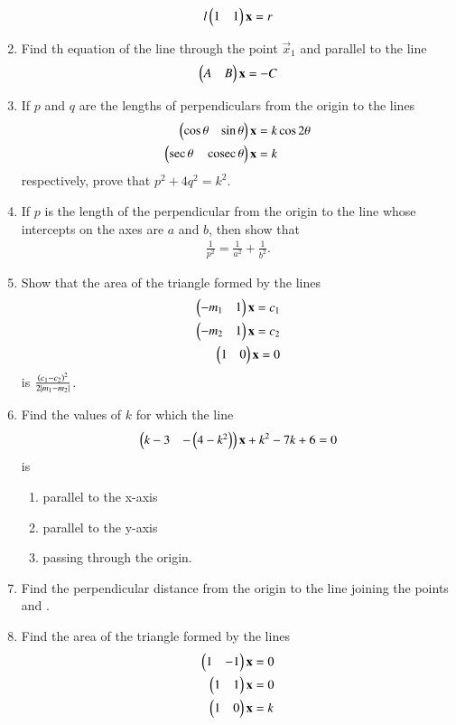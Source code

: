 \begin{enumerate}[label=\arabic*.,ref=\thesubsection.\theenumi]
\begin{align}
l\begin{pmatrix}1 & 1\end{pmatrix}\mathbf{x} = r
\end{align}
%
\item Find th equation of the line through the point $\vec{x}_1$ and parallel to the line
%
\begin{align}
\begin{pmatrix}A & B\end{pmatrix}\mathbf{x} = -C
\end{align}
%
\item If $p$ and $q$ are the lengths of perpendiculars from the origin to the lines 
%
\begin{align}
\begin{pmatrix}\cos\theta & \sin\theta\end{pmatrix}\mathbf{x} &= k\cos2\theta
\\
\begin{pmatrix}\sec\theta & \,\text{cosec}\,\theta\end{pmatrix}\mathbf{x} &= k
\end{align}
%
respectively, prove that $p^2+4q^2=k^2$.
\item If $p$ is the length of the perpendicular from the origin to the line whose intercepts on the axes are $a$ and $b$, then show that 
%
\begin{align}
\frac{1}{p^2} = \frac{1}{a^2}+\frac{1}{b^2}.
\end{align}
%
\item Show that the area of the triangle formed by the lines
%
\begin{align}
\begin{pmatrix}-m_1 & 1\end{pmatrix}\mathbf{x} = c_1
\\
\begin{pmatrix}-m_2 & 1\end{pmatrix}\mathbf{x} = c_2
\\
\begin{pmatrix}1 & 0\end{pmatrix}\mathbf{x} = 0
\end{align}
%
is $\frac{\left(c_1-c_2\right)^2}{2\left\vert m_1-m_2\right\vert}$.
\item Find the values of $k$ for which the line 
%
\begin{align}
\begin{pmatrix}k-3 & -\left(4-k^2\right)\end{pmatrix}\mathbf{x} +k^2-7k+6= 0
\end{align}
%
is
\begin{enumerate}
\item parallel to the x-axis
\item parallel to the y-axis
\item passing through the origin.
\end{enumerate}
%
\item Find the perpendicular distance from the origin to the line joining the points \myvec{\cos\theta\sin\theta} and \myvec{\cos\phi \sin \phi}.
\item Find the area of the triangle formed by the lines
%
\begin{align}
\myvec{1 & -1}\vec{x} &= 0
\\
\myvec{1 & 1}\vec{x} &= 0
\\
\myvec{1 & 0}\vec{x} &= k

\end{align}
\end{enumerate}
